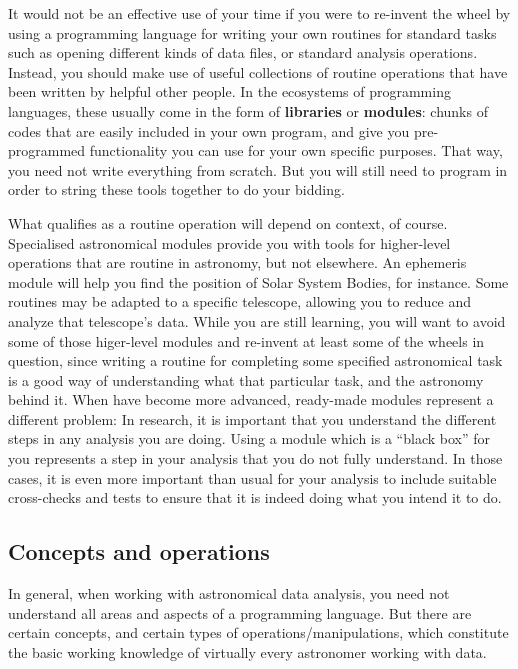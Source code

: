 \documentclass[twocolumn,apj]{openjournal}
\begin{document}
It would not be an effective use of your time if you were to re-invent the wheel by using a programming language for writing your own routines for standard tasks such as opening different kinds of data files, or standard analysis operations. Instead, you should make use of useful collections of routine operations that have been written by helpful other people. In the ecosystems of programming languages, these usually come in the form of {\bf libraries} or {\bf modules}: chunks of codes that are easily included in your own program, and give you pre-programmed functionality you can use for your own specific purposes. That way, you need not write everything from scratch. But you will still need to program in order to string these tools together to do your bidding. 

What qualifies as a routine operation will depend on context, of course. Specialised astronomical modules provide you with tools for higher-level operations that are routine in astronomy, but not elsewhere. An ephemeris module will help you find the position of Solar System Bodies, for instance. Some routines may be adapted to a specific telescope, allowing you to reduce and analyze that telescope's data. While you are still learning, you will want to avoid some of those higer-level modules and re-invent at least some of the wheels in question, since writing a routine for completing some specified astronomical task is a good way of understanding what that particular task, and the astronomy behind it. When have become more advanced, ready-made modules represent a different problem: In research, it is important that you understand the different steps in any analysis you are doing. Using a module which is a ``black box'' for you represents a step in your analysis that you do not fully understand. In those cases, it is even more important than usual for your analysis to include suitable cross-checks and tests to ensure that it is indeed doing what you intend it to do.

\subsection{Concepts and operations}

In general, when working with astronomical data analysis, you need not understand all areas and aspects of a programming language. But there are certain concepts, and certain types of operations/manipulations, which constitute the basic working knowledge of virtually every astronomer working with data.
\end{document}

